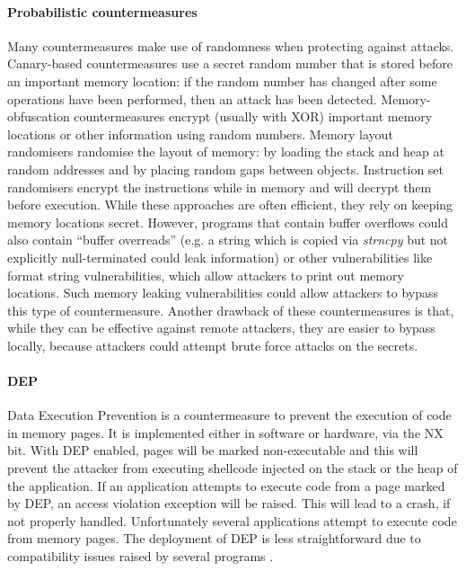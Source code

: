 \paragraph{Probabilistic countermeasures}
Many countermeasures make use of randomness when protecting against attacks. Canary-based countermeasures \cite{Krennmair:2003:CLE,Robertson:2003:RTD} 
use a secret random number that is stored before an important memory location: if the random number has changed after some operations have been performed, then an attack has been detected. Memory-obfuscation countermeasures \cite{Bhatkar:2008:DSR,Cowan:2003:PPP} encrypt (usually with XOR) important memory locations or other information using random numbers.  Memory layout randomisers \cite{Bhatkar:2003:AOE,Bhatkar:2005:ETC,Xu:2003:TRR} 
randomise the layout of memory: by loading the stack and heap at random addresses and by placing random gaps between objects. Instruction set randomisers \cite{Barrantes:2003:RIS}
encrypt the instructions while in memory and will decrypt them before execution. While these approaches are often efficient, they rely on keeping memory locations secret. However, programs that contain buffer overflows could also contain ``buffer overreads'' (e.g. a string which is copied via \emph{strncpy} but not explicitly null-terminated could leak information) or other vulnerabilities like format string vulnerabilities, which allow attackers to print out memory locations. Such memory leaking vulnerabilities could allow attackers to bypass this type of countermeasure. Another drawback of these countermeasures is that, while they can be effective against remote attackers, they are easier to bypass locally, because attackers could attempt brute force attacks on the secrets.
 
\paragraph{DEP}
Data Execution Prevention \cite{dep} is a countermeasure to prevent the execution of code in memory pages. It is implemented  either in software or hardware, via the NX bit. With DEP enabled, pages will be marked non-executable and this will prevent the attacker from executing shellcode injected on the stack or the heap of the application. If an application attempts to execute code from a page marked by DEP, an access violation exception will be raised. This will lead to a crash, if not properly handled.
Unfortunately several applications attempt to execute code from memory pages. The deployment of DEP is less straightforward due to compatibility issues raised by several programs \cite{depdef}.

